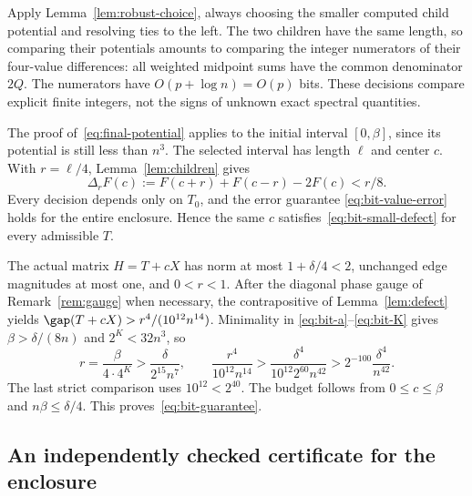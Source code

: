 Apply Lemma~\ref{lem:robust-choice}, always choosing the smaller
computed child potential and resolving ties to the left. The two
children have the same length, so comparing their potentials amounts
to comparing the integer numerators of their four-value differences:
all weighted midpoint sums have the common denominator $2Q$.
The numerators have $O(p+\log n)=O(p)$ bits. These decisions compare
explicit finite integers, not the signs of unknown exact spectral
quantities.

The proof of~\eqref{eq:final-potential} applies to the initial
interval $[0,\beta]$, since its potential is still less than $n^3$.
The selected interval has length $\ell$ and center $c$. With
$r=\ell/4$, Lemma~\ref{lem:children} gives
\begin{equation}\label{eq:bit-small-defect}
 \Delta_r F(c):=F(c+r)+F(c-r)-2F(c)<r/8.
\end{equation}
Every decision depends only on $T_0$, and the error guarantee
\eqref{eq:bit-value-error} holds for the entire enclosure. Hence
the same $c$ satisfies~\eqref{eq:bit-small-defect} for every
admissible $T$.

The actual matrix $H=T+cX$ has norm at most $1+\delta/4<2$,
unchanged edge magnitudes at most one, and $0<r<1$. After the
diagonal phase gauge of Remark~\ref{rem:gauge} when necessary,
the contrapositive of Lemma~\ref{lem:defect} yields
$\gap(T+cX)>r^4/(10^{12}n^{14})$. Minimality in
\eqref{eq:bit-a}--\eqref{eq:bit-K} gives
$\beta>\delta/(8n)$ and $2^K<32n^3$, so
\begin{equation}\label{eq:bit-gap-constant}
 r=\frac{\beta}{4\cdot4^K}>
       \frac{\delta}{2^{15}n^7},\qquad
 \frac{r^4}{10^{12}n^{14}}>
       \frac{\delta^4}{10^{12}2^{60}n^{42}}>
       2^{-100}\frac{\delta^4}{n^{42}}.
\end{equation}
The last strict comparison uses $10^{12}<2^{40}$. The budget
follows from $0\leq c\leq\beta$ and $n\beta\leq\delta/4$.
This proves~\eqref{eq:bit-guarantee}.

\subsection{An independently checked certificate for the enclosure}
\label{subsec:bit-certificate}


